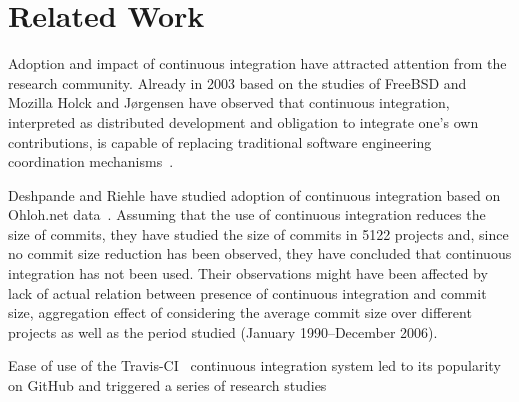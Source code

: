 \section{Related Work}
\label{sec:rw}
Adoption and impact of continuous integration have attracted  attention from the research community. Already in 2003 based on the studies of FreeBSD and Mozilla Holck and J{\o}rgensen have observed that continuous integration, interpreted as distributed development and obligation to integrate one's own contributions, is capable of replacing traditional software engineering coordination mechanisms~\cite{HolckJ03}.  


Deshpande and Riehle have studied adoption of continuous integration based on Ohloh.net data~\cite{Deshpande2008}. Assuming that the use of continuous integration reduces the size of commits, they have studied the size of commits in 5122 projects and, since no commit size reduction has been observed, they have concluded that continuous integration has not been used. Their observations might have been affected by lack of actual relation between presence of continuous integration and commit size, aggregation effect of considering the average commit size over different projects as well as the period studied (January 1990--December 2006). 

Ease of use of the Travis-CI~\cite{TravisCI} continuous integration system led to its popularity on GitHub and triggered a series of research studies~\cite{era14,VasilescuYWDF15,yue2015wait,BellerGZ16}